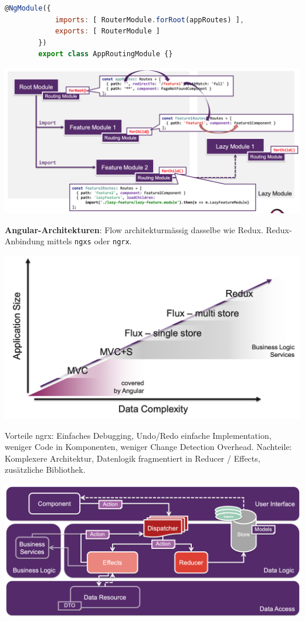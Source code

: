 \documentclass[10pt,landscape]{article}
\begin{document}
\begin{multicols}{2}
\begin{lstlisting}[language=JavaScript]
        @NgModule({
            imports: [ RouterModule.forRoot(appRoutes) ],
            exports: [ RouterModule ]
        })
        export class AppRoutingModule {}
        \end{lstlisting}

        \includegraphics[width=\linewidth]{angular_routing}

        \textbf{Angular-Architekturen}: Flow architekturmässig dasselbe wie Redux.
        Redux-Anbindung mittels \lstinline{ngxs} oder \lstinline{ngrx}.

        \includegraphics[width=\linewidth]{angular_architecture_big_picture}

        Vorteile ngrx: Einfaches Debugging, Undo/Redo einfache Implementation, weniger Code in Komponenten, weniger Change Detection Overhead.
        Nachteile: Komplexere Architektur, Datenlogik fragmentiert in Reducer / Effects, zusätzliche Bibliothek.

        \includegraphics[width=\linewidth]{angular_ngrx_architecture}


\end{multicols}
\end{document}
